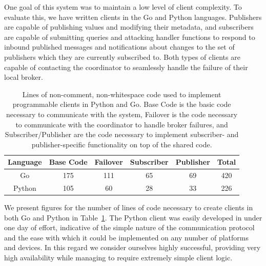 One goal of this system was to maintain a low level of client complexity.
To evaluate this, we have written clients in the Go and Python languages.
Publishers are capable of publishing values and modifying their metadata, and subscribers are capable of submitting queries and attacking handler functions to respond to inbound published messages and notifications about changes to the set of publishers which they are currently subscribed to.
Both types of clients are capable of contacting the coordinator to seamlessly handle the failure of their local broker.

\begin{table}
\centering
\caption{Lines of non-comment, non-whitespace code used to implement programmable clients in Python and Go.
Base Code is the basic code necessary to communicate with the system, Failover is the code necessary to communicate with the coordinator to handle broker failures, and Subscriber/Publisher are the code necessary to implement subscriber- and publisher-specific functionality on top of the shared code.}
\label{tbl:client_code}
\begin{tabular}{ | c | c | c | c | c | c | }
\hline
Language & Base Code & Failover & Subscriber & Publisher & Total
\\\hline
Go & 175 & 111 & 65 & 69 & 420
\\\hline
Python & 105 & 60 & 28 & 33 & 226
\\\hline
\end{tabular}
\end{table}

We present figures for the number of lines of code necessary to create clients in both Go and Python in Table~\ref{tbl:client_code}.
The Python client was easily developed in under one day of effort, indicative of the simple nature of the communication protocol and the ease with which it could be implemented on any number of platforms and devices.
In this regard we consider ourselves highly successful, providing very high availability while managing to require extremely simple client logic.

